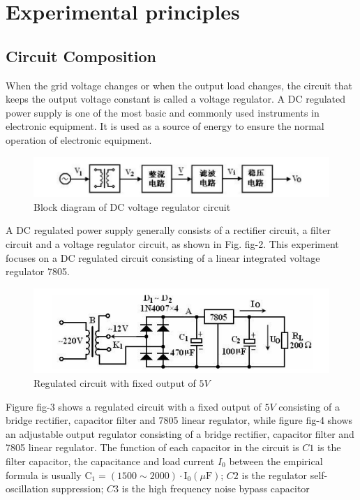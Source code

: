 \documentclass[UTF8]{article}
\begin{document}
        
	\section{Experimental principles}   
    \subsection{Circuit Composition}
    When the grid voltage changes or when the output load changes, the circuit that keeps the output voltage constant is called a voltage regulator. A DC regulated power supply is one of the most basic and commonly used instruments in electronic equipment. It is used as a source of energy to ensure the normal operation of electronic equipment.
    	\begin{figure}[H]
    	    	\centering
    	    	\includegraphics[clip,scale=1,trim={0 0 0 0}]{fig/fig2.png}
    	        \caption{Block diagram of DC voltage regulator circuit}
    	        \label{figure.2}
        \end{figure}    
    
    A DC regulated power supply generally consists of a rectifier circuit, a filter circuit and a voltage regulator circuit, as shown in Fig. fig-2. This experiment focuses on a DC regulated circuit consisting of a linear integrated voltage regulator 7805.
    	\begin{figure}[H]
    	    	\centering
    	    	\includegraphics[clip,scale=1,trim={0 0 0 0}]{fig/fig3.png}
    	        \caption{Regulated circuit with fixed output of $5V$}
    	        \label{figure.3}
        \end{figure}   
    Figure fig-3 shows a regulated circuit with a fixed output of $5V$ consisting of a bridge rectifier, capacitor filter and 7805 linear regulator, while figure fig-4 shows an adjustable output regulator consisting of a bridge rectifier, capacitor filter and 7805 linear regulator. The function of each capacitor in the circuit is $C1$ is the filter capacitor, the capacitance and load current $I_0$ between the empirical formula is usually $\mathrm{C}_{1}=(1500 \sim 2000) \cdot \mathrm{I}_{0}(\mu \mathrm{F})$; $C2$ is the regulator self-oscillation suppression; $C3$ is the high frequency noise bypass capacitor
         
\end{document}
